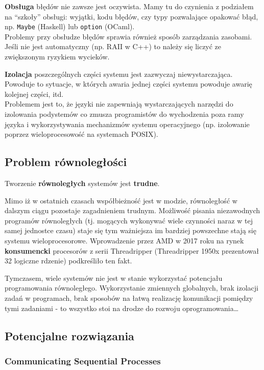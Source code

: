 \documentclass[11pt,oneside,a4paper,titlepage,onecolumn]{article}
\begin{document}
\textbf{Obsługa} błędów nie zawsze jest oczywista. Mamy tu do czynienia z podziałem na ``szkoły''
obsługi: wyjątki, kodu błędów, czy typy pozwalające opakować błąd, np. \texttt{Maybe} (Haskell) lub
\texttt{option} (OCaml). \\
Problemy przy obsłudze błędów sprawia również sposób zarządzania zasobami. Jeśli nie jest
automatyczny (np. RAII w C++) to należy się liczyć ze zwiększonym ryzykiem wycieków.

\textbf{Izolacja} poszczególnych części systemu jest zazwyczaj niewystarczająca. Powoduje to
sytuacje, w których awaria jednej części systemu powoduje awarię kolejnej części, itd. \\
Problemem jest to, że języki nie zapewniają wystarczających narzędzi do izolowania podystemów co
zmusza programistów do wychodzenia poza ramy języka i wykorzystywania mechanizmów systemu
operacyjnego (np. izolowanie poprzez wieloprocesowość na systemach POSIX).

\subsection{Problem równoległości}

\begin{center}
    Tworzenie \textbf{równoległych} systemów jest \textbf{trudne}.
\end{center}

Mimo iż w ostatnich czasach współbieżność jest w modzie, równoległość w dalszym ciągu pozostaje
zagadnieniem trudnym. Możliwość pisania niezawodnych programów równoległych (tj. mogących wykonywać
wiele czynności naraz w tej samej jednostce czasu) staje się tym ważniejsza im bardziej powszechne
stają się systemu wieloprocesorowe.
Wprowadzenie przez AMD w 2017 roku na rynek \textbf{konsumencki} procesorów z serii
Threadripper (Threadripper 1950x prezentował 32 logiczne rdzenie) podkreśliło ten fakt.

Tymczasem, wiele systemów nie jest w stanie wykorzystać potencjału programowania równoległego.
Wykorzystanie zmiennych globalnych, brak izolacji zadań w programach, brak sposobów na łatwą realizację
komunikacji pomiędzy tymi zadaniami - to wszystko stoi na drodze do rozwoju oprogramowania\ldots

\subsection{Potencjalne rozwiązania}

\subsubsection{Communicating Sequential Processes}
\end{document}
